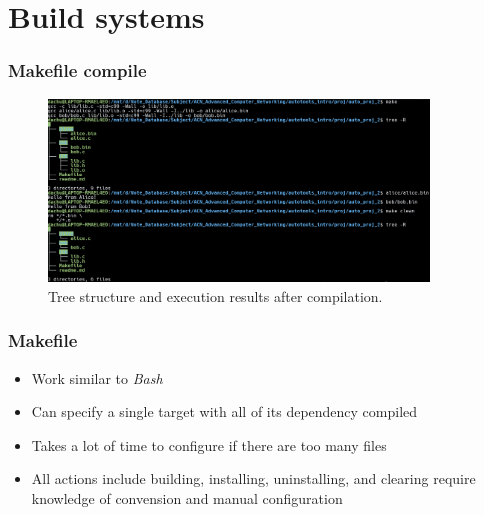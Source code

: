\section{Build systems}


\begin{frame}
    \frametitle{Makefile compile}

    \begin{figure}[H]
        \centering
        \includegraphics[width=0.9\textwidth]{../figure/makefile_compile.png}
        \caption*{Tree structure and execution results after compilation.}
    \end{figure}
\end{frame}

\begin{frame}
    \frametitle{Makefile}

    \begin{itemize}
        \item Work similar to \textit{Bash}
        \item Can specify a single target with all of its dependency compiled
        \item Takes a lot of time to configure if there are too many files
        \item All actions include \alert{building}, \alert{installing}, \alert{uninstalling}, and \alert{clearing} require knowledge of convension and manual configuration
    \end{itemize}
\end{frame}

